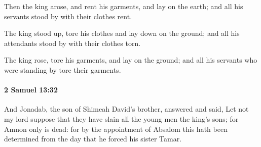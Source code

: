 			\begin{versebox}
					\item[BHS] 
					\item[ASV] Then the king arose, and rent his garments, and lay on the earth; and all his servants stood by with their clothes rent.
					\item[NIV] The king stood up, tore his clothes and lay down on the ground; and all his attendants stood by with their clothes torn.
					\item[NRSV] The king rose, tore his garments, and lay on the ground; and all his servants who were standing by tore their garments.
			\end{versebox}

		\paragraph{2 Samuel 13:32} %
			\label{2SAMUEL-13-32}

			And Jonadab, the son of Shimeah David’s brother, answered and said, Let not my lord suppose that they have slain all the young men the king’s sons; for Amnon only is dead: for by the appointment of Absalom this hath been determined from the day that he forced his sister Tamar.

